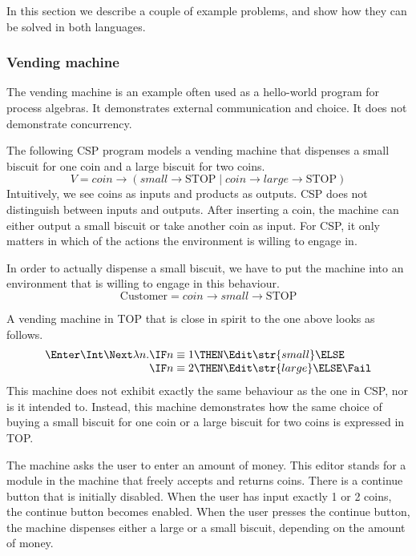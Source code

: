 In this section we describe a couple of example problems, and show how they can be solved in both languages.


\subsubsection{Vending machine}

The vending machine is an example often used as a hello-world program for process algebras.
It demonstrates external communication and choice.
It does not demonstrate concurrency.

The following CSP program models a vending machine that dispenses a small biscuit for one coin and a large biscuit for two coins. $$V = \textit{coin} \to (\textit{small} \to \text{STOP} \mid \textit{coin} \to \textit{large} \to \text{STOP})$$
Intuitively, we see coins as inputs and products as outputs.
CSP does not distinguish between inputs and outputs.
After inserting a coin, the machine can either output a small biscuit or take another coin as input.
For CSP, it only matters in which of the actions the environment is willing to engage in.

In order to actually dispense a small biscuit, we have to put the machine into an environment that is willing to engage in this behaviour. $$\text{Customer} = \textit{coin} \to \textit{small} \to \text{STOP}$$

A vending machine in TOP that is close in spirit to the one above looks as follows.
\begin{equation*}
  \begin{array}{l @{} l}
    \Enter \Int \Next \lambda n. &
          \IF n \equiv 1 \THEN \Edit \str{small} \ELSE \\
        & \IF n \equiv 2 \THEN \Edit \str{large} \ELSE \Fail
  \end{array}
\end{equation*}
This machine does not exhibit exactly the same behaviour as the one in CSP, nor is it intended to.
Instead, this machine demonstrates how the same choice of buying a small biscuit for one coin or a large biscuit for two coins is expressed in TOP.

The machine asks the user to enter an amount of money.
This editor stands for a module in the machine that freely accepts and returns coins.
There is a continue button that is initially disabled.
When the user has input exactly 1 or 2 coins, the continue button becomes enabled.
When the user presses the continue button, the machine dispenses either a large or a small biscuit, depending on the amount of money.


